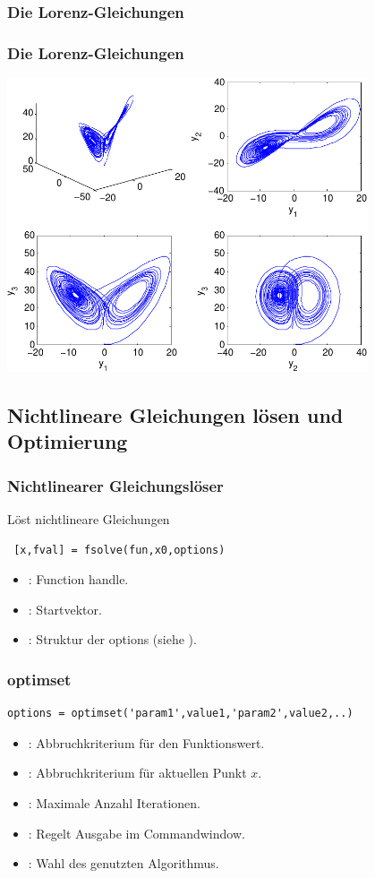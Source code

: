 \documentclass[hyperref={xetex}]{beamer}
\begin{document}
%
%
\begin{frame}[fragile]\frametitle{Die Lorenz-Gleichungen}

\end{frame}
%
%
\begin{frame}[fragile]\frametitle{Die Lorenz-Gleichungen}
\begin{center}
\includegraphics[width=0.8\textwidth]{./figures/lorenz}
\end{center}
\end{frame}

\subsection{Nichtlineare Gleichungen lösen und Optimierung}

\begin{frame}[fragile]\frametitle{Nichtlinearer Gleichungslöser}
Löst nichtlineare Gleichungen
\begin{lstlisting}
 [x,fval] = fsolve(fun,x0,options)
\end{lstlisting}
\begin{itemize}
 \item {}: Function handle.
\item {}: Startvektor.
\item {}: Struktur der options (siehe ).
\end{itemize}

\end{frame}

\begin{frame}[fragile]\frametitle{optimset}
\begin{lstlisting}
options = optimset('param1',value1,'param2',value2,..) 
\end{lstlisting}
\begin{itemize}
 \item {}: Abbruchkriterium für den Funktionswert.
\item {}: Abbruchkriterium für aktuellen Punkt $x$.
\item {}: Maximale Anzahl Iterationen.
\item {}: Regelt Ausgabe im Commandwindow.
\item {}: Wahl des genutzten Algorithmus.
\end{itemize}
\end{frame}
\end{document}
